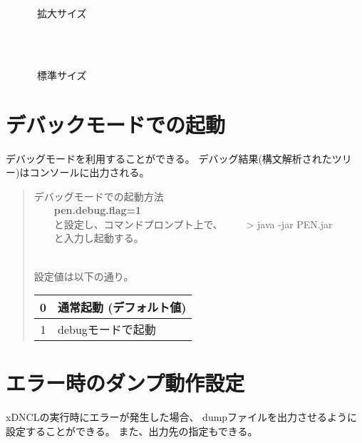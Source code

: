 \documentclass[10pt,a4j]{jarticle}
\begin{document}
\begin{figure}[!h]
\begin{minipage}{50zw}
\begin{center}
\caption{$\!\!\!\!$\colorbox{white}{{\textcolor{white}{:}}}拡大サイズ }
\label{fig:font01}
\end{center}
\end{minipage}
\ \\
\ \\
\begin{minipage}{50zw}
\begin{center}
\caption{$\!\!\!\!$\colorbox{white}{{\textcolor{white}{:}}}標準サイズ}
\label{fig:font02}
\end{center}
\end{minipage}

\end{figure}


\section{デバックモードでの起動}
デバッグモードを利用することができる。
デバッグ結果(構文解析されたツリー)はコンソールに出力される。

\begin{quotation}
\noindent [使用例] デバッグモードでの起動方法\\
~~~~{\bf{pen.debug.flag=1}}\\
~~~~と設定し、コマンドプロンプト上で、
~~~~> java -jar PEN.jar
~~~~と入力し起動する。

\ \\
設定値は以下の通り。\\

\begin{tabular}{c|l}
\hline
0 & 通常起動 (デフォルト値) \\
\hline
1 & debugモードで起動 \\
\hline
\end{tabular}


\end{quotation}

\section{エラー時のダンプ動作設定}
xDNCLの実行時にエラーが発生した場合、
dumpファイルを出力させるように設定することができる。
また、出力先の指定もできる。
\end{document}
